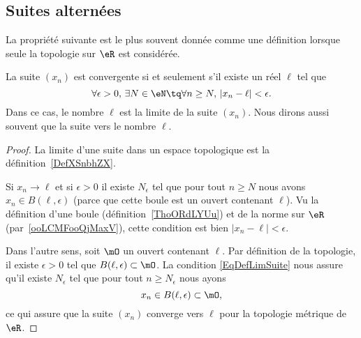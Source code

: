 \subsection{Suites alternées}


La propriété suivante est le plus souvent donnée comme une définition lorsque seule la topologie sur \( \eR\) est considérée.
\begin{proposition}	\label{PropLimiteSuiteNum}
	La suite $(x_n)$ est convergente si et seulement s'il existe un réel $\ell$ tel que
	\begin{equation}		\label{EqDefLimSuite}
		\forall \epsilon>0,\,\exists N\in\eN\tq\forall n\geq N,\,| x_n-\ell |<\epsilon.
	\end{equation}
	Dans ce cas, le nombre $\ell$ est la limite de la suite $(x_n)$. Nous dirons aussi souvent que la suite  vers le nombre $\ell$.
\end{proposition}

\begin{proof}
    La limite d'une suite dans un espace topologique est la définition~\ref{DefXSnbhZX}.

    Si \( x_n\to \ell\) et si \( \epsilon>0\) il existe \( N_{\epsilon}\) tel que pour tout \( n\geq N\) nous avons \( x_n\in B(\ell,\epsilon)\) (parce que cette boule est un ouvert contenant \( \ell\)). Vu la définition d'une boule (définition~\ref{ThoORdLYUu}) et de la norme sur \( \eR\) (par~\ref{ooLCMFooQjMaxV}), cette condition est bien \( | x_n-\ell |<\epsilon\).

    Dans l'autre sens, soit \( \mO\) un ouvert contenant \( \ell\). Par définition de la topologie, il existe \( \epsilon>0\) tel que \( B(\ell,\epsilon)\subset \mO\). La condition \eqref{EqDefLimSuite} nous assure qu'il existe \( N_{\epsilon} \) tel que pour tout \( n\geq N_{\epsilon}\) nous ayons
    \begin{equation}
        x_n\in B(\ell,\epsilon)\subset\mO,
    \end{equation}
    ce qui assure que la suite \( (x_n)\) converge vers \( \ell\) pour la topologie métrique de \( \eR\).
\end{proof}


